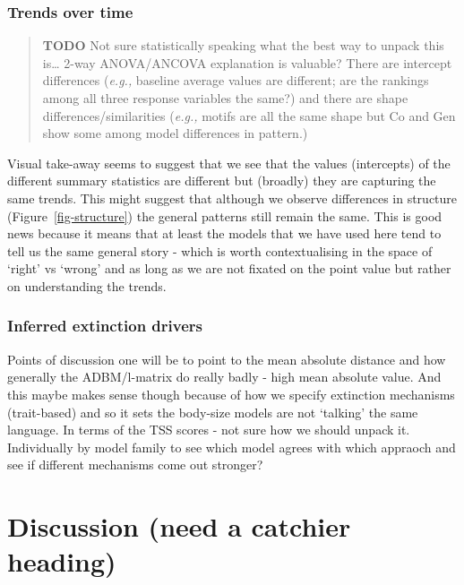 \documentclass[
]{article}
\begin{document}
\subsubsection{Trends over time}\label{trends-over-time}

\begin{quote}
\textbf{TODO} Not sure statistically speaking what the best way to
unpack this is\ldots{} 2-way ANOVA/ANCOVA explanation is valuable? There
are intercept differences (\emph{e.g.,} baseline average values are
different; are the rankings among all three response variables the
same?) and there are shape differences/similarities (\emph{e.g.,} motifs
are all the same shape but Co and Gen show some among model differences
in pattern.)
\end{quote}

Visual take-away seems to suggest that we see that the values
(intercepts) of the different summary statistics are different but
(broadly) they are capturing the same trends. This might suggest that
although we observe differences in structure
(Figure~\ref{fig-structure}) the general patterns still remain the same.
This is good news because it means that at least the models that we have
used here tend to tell us the same general story - which is worth
contextualising in the space of `right' vs `wrong' and as long as we are
not fixated on the point value but rather on understanding the trends.

\subsubsection{Inferred extinction
drivers}\label{inferred-extinction-drivers}

Points of discussion one will be to point to the mean absolute distance
and how generally the ADBM/l-matrix do really badly - high mean absolute
value. And this maybe makes sense though because of how we specify
extinction mechanisms (trait-based) and so it sets the body-size models
are not `talking' the same language. In terms of the TSS scores - not
sure how we should unpack it. Individually by model family to see which
model agrees with which appraoch and see if different mechanisms come
out stronger?

\section{Discussion (need a catchier
heading)}\label{discussion-need-a-catchier-heading}
\end{document}
